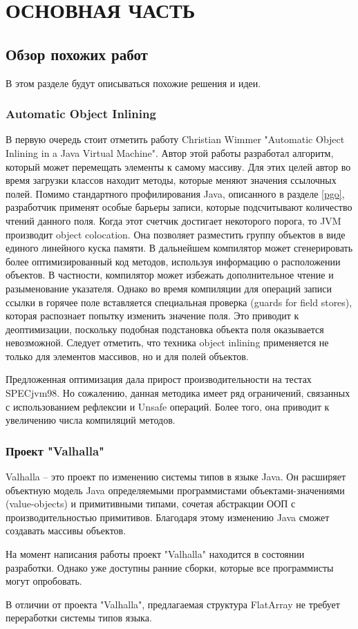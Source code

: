 \section*{ОСНОВНАЯ ЧАСТЬ}
\addtocounter{section}{1}
\setcounter{subsection}{0}

\subsection{Обзор похожих работ}
В этом разделе будут описываться похожие решения и идеи.
\subsubsection{Automatic Object Inlining} 
В первую очередь стоит отметить работу Christian Wimmer "Automatic Object Inlining in a Java Virtual Machine"\cite{wimmer-field-inlining}.
Автор этой работы разработал алгоритм, который может перемещать элементы к самому массиву.
Для этих целей автор во время загрузки классов находит методы, которые меняют значения ссылочных полей. 
Помимо стандартного профилирования Java, описанного в разделе \ref{pgo}, разработчик применят особые барьеры записи, которые подсчитывают количество чтений данного поля. Когда этот счетчик достигает некоторого порога, то JVM производит object colocation. 
Она позволяет разместить группу объектов в виде единого линейного куска памяти. 
В дальнейшем компилятор может сгенерировать более оптимизированный код методов, используя информацию о расположении объектов. В частности, компилятор может избежать дополнительное чтение и разыменование указателя. 
Однако во время компиляции для операций записи ссылки в горячее поле вставляется специальная проверка (guards for field stores), которая распознает попытку изменить значение поля. 
Это приводит к деоптимизации, поскольку подобная подстановка объекта поля оказывается невозможной. Следует отметить, что техника object inlining применяется не только для элементов массивов, но и для полей объектов.
\par
Предложенная оптимизация дала прирост производительности на тестах SPECjvm98\cite{spec98}. 
Но сожалению, данная методика имеет ряд ограничений, связанных с использованием рефлексии и Unsafe операций. Более того, она приводит к увеличению числа компиляций методов.
\subsubsection{Проект "Valhalla"}
Valhalla -- это проект по изменению системы типов в языке Java\cite{valhalla}. Он расширяет объектную модель Java определяемыми программистами объектами-значениями (value-objects) и примитивными типами, сочетая абстракции ООП с производительностью примитивов. Благодаря этому изменению Java сможет создавать массивы объектов\cite{valhalla-value-object}.
\par
На момент написания работы проект "Valhalla" находится в состоянии разработки. Однако уже доступны ранние сборки, которые все программисты могут опробовать.
\par
В отличии от проекта "Valhalla", предлагаемая структура FlatArray не требует переработки системы типов языка.

